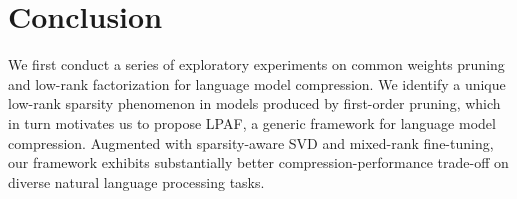 \section{Conclusion}
We first conduct a series of exploratory experiments on common weights 
pruning and low-rank factorization for language model compression. 
We identify a unique low-rank sparsity phenomenon in models produced by first-order pruning, 
which in turn motivates us to propose LPAF, a generic framework for language model compression. 
Augmented with sparsity-aware SVD and mixed-rank fine-tuning, our framework exhibits 
substantially better compression-performance trade-off on diverse natural language processing tasks.

